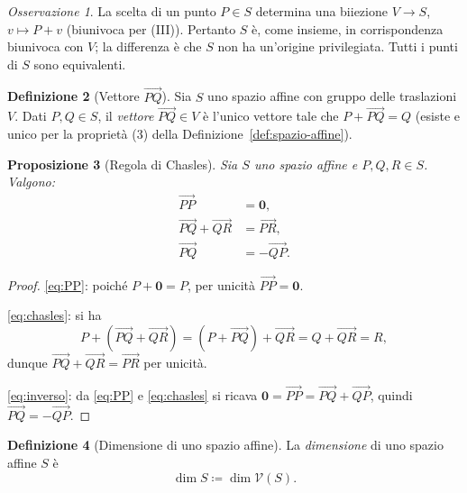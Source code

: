 \documentclass[11pt, a4paper]{book}
\theoremstyle{definition}
\newtheorem{definizione}{Definizione}[section]
\theoremstyle{plain}
\newtheorem{proposizione}[definizione]{Proposizione}
\theoremstyle{remark}
\newtheorem{osservazione}[definizione]{Osservazione}
\newcommand{\VV}{\mathcal{V}}   %
\begin{document}
\begin{osservazione}
La scelta di un punto $P \in S$ determina una biiezione $V \to S$, $v \mapsto P + v$ (biunivoca per (III)). Pertanto $S$ è, come insieme, in corrispondenza biunivoca con $V$; la differenza è che $S$ non ha un'origine privilegiata. Tutti i punti di $S$ sono equivalenti.
\end{osservazione}

\begin{defbox}
\begin{definizione}[Vettore $\overrightarrow{PQ}$]
\label{def:vett-pq}
Sia $S$ uno spazio affine con gruppo delle traslazioni $V$. Dati $P, Q \in S$, il \emph{vettore} $\overrightarrow{PQ} \in V$ è l'unico vettore tale che $P + \overrightarrow{PQ} = Q$ (esiste e unico per la proprietà (3) della Definizione~\ref{def:spazio-affine}).
\end{definizione}
\end{defbox}

\begin{proposizione}[Regola di Chasles]
\label{prop:chasles}
Sia $S$ uno spazio affine e $P, Q, R \in S$. Valgono:
\begin{align}
  \overrightarrow{PP} &= \mathbf{0}, \label{eq:PP}\\
  \overrightarrow{PQ} + \overrightarrow{QR} &= \overrightarrow{PR}, \label{eq:chasles}\\
  \overrightarrow{PQ} &= -\overrightarrow{QP}. \label{eq:inverso}
\end{align}
\end{proposizione}

\begin{proof}
\eqref{eq:PP}: poiché $P + \mathbf{0} = P$, per unicità $\overrightarrow{PP} = \mathbf{0}$.

\eqref{eq:chasles}: si ha
\[
  P + (\overrightarrow{PQ} + \overrightarrow{QR}) = (P + \overrightarrow{PQ}) + \overrightarrow{QR} = Q + \overrightarrow{QR} = R,
\]
dunque $\overrightarrow{PQ} + \overrightarrow{QR} = \overrightarrow{PR}$ per unicità.

\eqref{eq:inverso}: da \eqref{eq:PP} e \eqref{eq:chasles} si ricava $\mathbf{0} = \overrightarrow{PP} = \overrightarrow{PQ} + \overrightarrow{QP}$, quindi $\overrightarrow{PQ} = -\overrightarrow{QP}$.
\end{proof}

\begin{defbox}
\begin{definizione}[Dimensione di uno spazio affine]
La \emph{dimensione} di uno spazio affine $S$ è
\[
  \dim S \coloneqq \dim \VV(S).
\]
\end{definizione}
\end{defbox}
\end{document}
